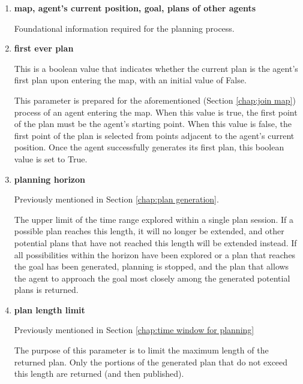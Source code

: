 \begin{enumerate}
    \item \textbf{map, agent's current position, goal, plans of other agents}

    Foundational information required for the planning process.

    \item \textbf{first ever plan}
    
    This is a boolean value that indicates whether the current plan is the agent's first plan upon entering the map, with an initial value of False.


    This parameter is prepared for the aforementioned (Section \ref{chap:join map}) process of an agent entering the map. When this value is true, the first point of the plan must be the agent's starting point. When this value is false, the first point of the plan is selected from points adjacent to the agent's current position.
    Once the agent successfully generates its first plan, this boolean value is set to True.


    \item \textbf{planning horizon}

    Previously mentioned in Section \ref{chap:plan generation}.

    The upper limit of the time range explored within a single plan session. 
    If a possible plan reaches this length, it will no longer be extended, and other potential plans that have not reached this length will be extended instead.
    If all possibilities within the horizon have been explored or a plan that reaches the goal has been generated, planning is stopped, 
    and the plan that allows the agent to approach the goal most closely among the generated potential plans is returned.



    \item \textbf{plan length limit}
    
    Previously mentioned in Section \ref{chap:time window for planning}
    
    The purpose of this parameter is to limit the maximum length of the returned plan. Only the portions of the generated plan that do not exceed this length are returned (and then published).
    

    
\end{enumerate}

